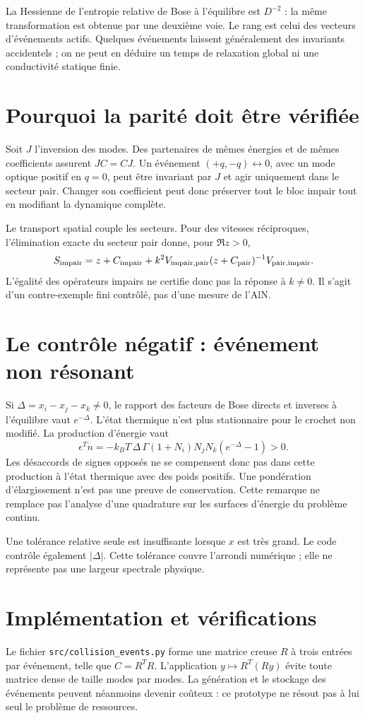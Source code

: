 \documentclass[11pt,a4paper]{article}
\begin{document}
La Hessienne de l'entropie relative de Bose à l'équilibre est
$D^{-2}$ : la même transformation est obtenue par une deuxième voie.
Le rang est celui des vecteurs d'événements actifs. Quelques événements
laissent généralement des invariants accidentels ; on ne peut en déduire
un temps de relaxation global ni une conductivité statique finie.

\section{Pourquoi la parité doit être vérifiée}
Soit $J$ l'inversion des modes. Des partenaires de mêmes énergies
et de mêmes coefficients assurent $JC=CJ$. Un événement
$(+q,-q)\leftrightarrow0$, avec un mode optique positif en $q=0$,
peut être invariant par $J$ et agir uniquement dans le secteur pair.
Changer son coefficient peut donc préserver tout le bloc impair tout
en modifiant la dynamique complète.

Le transport spatial couple les secteurs. Pour des vitesses réciproques,
l'élimination exacte du secteur pair donne, pour $\Re z>0$,
\[
 S_{\rm impair}=z+C_{\rm impair}
  +k^2V_{\rm impair,pair}(z+C_{\rm pair})^{-1}V_{\rm pair,impair}.
\]
L'égalité des opérateurs impairs ne certifie donc pas la réponse à $k\ne0$.
Il s'agit d'un contre-exemple fini contrôlé, pas d'une mesure de l'AlN.

\section{Le contrôle négatif : événement non résonant}
Si $\Delta=x_i-x_j-x_k\ne0$, le rapport des facteurs de Bose directs et
inverses à l'équilibre vaut $e^{-\Delta}$. L'état thermique n'est plus
stationnaire pour le crochet non modifié. La production d'énergie vaut
\[
 \epsilon^T\dot n
 =-k_BT\,\Delta\,\Gamma(1+N_i)N_jN_k(e^{-\Delta}-1)>0 .
\]
Les désaccords de signes opposés ne se compensent donc pas dans cette
production à l'état thermique avec des poids positifs.
Une pondération d'élargissement n'est pas une preuve de conservation.
Cette remarque ne remplace pas l'analyse d'une quadrature sur les surfaces
d'énergie du problème continu.

Une tolérance relative seule est insuffisante lorsque $x$ est très grand.
Le code contrôle également $|\Delta|$. Cette tolérance couvre l'arrondi
numérique ; elle ne représente pas une largeur spectrale physique.

\section{Implémentation et vérifications}
Le fichier \texttt{src/collision\_events.py} forme une matrice creuse $R$
à trois entrées par événement, telle que $C=R^TR$. L'application
$y\mapsto R^T(Ry)$ évite toute matrice dense de taille modes par modes.
La génération et le stockage des événements peuvent néanmoins devenir
coûteux : ce prototype ne résout pas à lui seul le problème de ressources.
\end{document}
